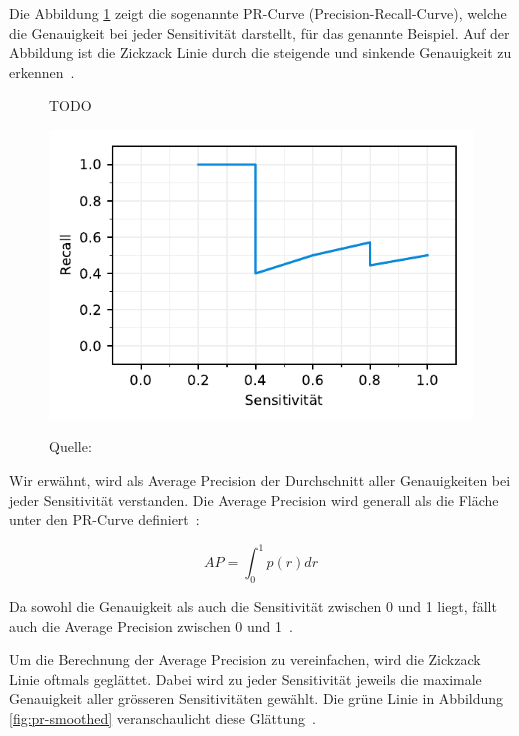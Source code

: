 Die Abbildung \ref{fig:ap-pr} zeigt die sogenannte PR-Curve (Precision-Recall-Curve), welche die Genauigkeit bei jeder Sensitivität darstellt, für das genannte Beispiel. Auf der Abbildung ist die Zickzack Linie durch die steigende und sinkende Genauigkeit zu erkennen~\autocite{AP}.

\begin{figure}[h!]
    \captionsetup{width=.9\linewidth}
    \caption{TODO}
    \label{fig:ap-pr}
    \centering
    \includegraphics[scale=1]{graphics/matplot/ap__pr.pdf}\\
    \caption*{Quelle: \textcite{AP}}
\end{figure}

Wir erwähnt, wird als Average Precision der Durchschnitt aller Genauigkeiten bei jeder Sensitivität verstanden. Die Average Precision wird generall als die Fläche unter den PR-Curve definiert~\autocite{AP}:

$$AP = \int_{0}^{1}p(r)dr$$

Da sowohl die Genauigkeit als auch die Sensitivität zwischen 0 und 1 liegt, fällt auch die Average Precision zwischen 0 und 1~\autocite{AP}.

Um die Berechnung der Average Precision zu vereinfachen, wird die Zickzack Linie oftmals geglättet. Dabei wird zu jeder Sensitivität jeweils die maximale Genauigkeit aller grösseren Sensitivitäten gewählt. Die grüne Linie in Abbildung \ref{fig:pr-smoothed} veranschaulicht diese Glättung~\autocite{AP}.

